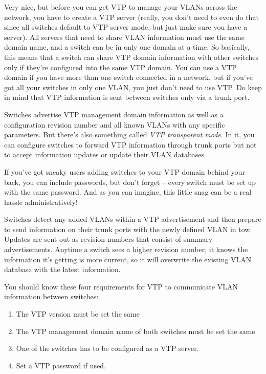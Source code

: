 Very nice, but before you can get VTP to manage your VLANs across the
network, you have to create a VTP server (really, you don't need to even
do that since all switches default to VTP server mode, but just make
sure you have a server). All servers that need to share VLAN information
must use the same domain name, and a switch can be in only one domain at
a time. So basically, this means that a switch can share VTP domain
information with other switches only if they're configured into the same
VTP domain. You can use a VTP domain if you have more than one switch
connected in a network, but if you've got
all your switches in
only one VLAN, you just don't need to use VTP. Do keep in mind that VTP
information is sent between switches only via a trunk port.

Switches advertise VTP management domain information as well as a
configuration revision number and all known VLANs with any specific
parameters. But there's also something called \emph{VTP transparent
mode}. In it, you can configure switches to forward VTP information
through trunk ports but not to accept information updates or update
their VLAN databases.

If you've got sneaky users adding switches to your VTP domain behind
your back, you can include passwords, but don't forget -- every switch
must be set up with the same password. And as you can imagine, this
little snag can be a real hassle administratively!

Switches detect any added VLANs within a VTP advertisement and then
prepare to send information on their trunk ports with the newly defined
VLAN in tow. Updates are sent out as revision numbers that consist of
summary advertisements. Anytime a switch sees a higher revision number,
it knows the information it's getting is more current, so it will
overwrite the existing VLAN database with the latest information.

You should know these four requirements for VTP to communicate VLAN
information between switches:

\begin{enumerate}
\tightlist
\item
  The VTP version must be set the same
\item
  The VTP management domain name of both switches must be set the same.
\item
  One of the switches has to be configured as a VTP server.
\item
  Set a VTP password if used.
\end{enumerate}

